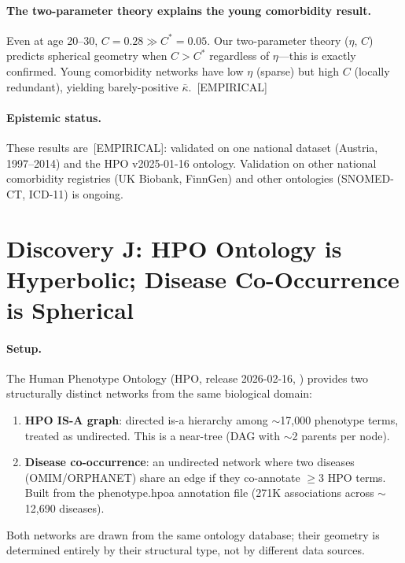 \documentclass[11pt,a4paper]{article}
\begin{document}
\paragraph{The two-parameter theory explains the young comorbidity result.}
Even at age 20--30, $C=0.28 \gg C^*=0.05$. Our two-parameter theory
($\eta$, $C$) predicts spherical geometry when $C > C^*$ regardless of $\eta$---this
is exactly confirmed. Young comorbidity networks have low $\eta$ (sparse) but high
$C$ (locally redundant), yielding barely-positive $\bar{\kappa}$.~[EMPIRICAL]

\paragraph{Epistemic status.}
These results are~[EMPIRICAL]: validated on one national dataset (Austria, 1997--2014)
and the HPO v2025-01-16 ontology. Validation on other national comorbidity registries
(UK Biobank, FinnGen) and other ontologies (SNOMED-CT, ICD-11) is ongoing.

\section{Discovery J: HPO Ontology is Hyperbolic; Disease Co-Occurrence is Spherical}
\label{sec:discovery_j}

\paragraph{Setup.}
The Human Phenotype Ontology (HPO, release 2026-02-16, \cite{kohler2021hpo}) provides two structurally distinct networks from the same biological domain:
\begin{enumerate}
  \item \textbf{HPO IS-A graph}: directed is-a hierarchy among $\sim$17,000 phenotype terms, treated as undirected. This is a near-tree (DAG with $\sim$2 parents per node).
  \item \textbf{Disease co-occurrence}: an undirected network where two diseases (OMIM/ORPHANET) share an edge if they co-annotate $\geq 3$ HPO terms. Built from the phenotype.hpoa annotation file (271K associations across $\sim$12,690 diseases).
\end{enumerate}
Both networks are drawn from the same ontology database; their geometry is determined entirely by their structural type, not by different data sources.
\end{document}
